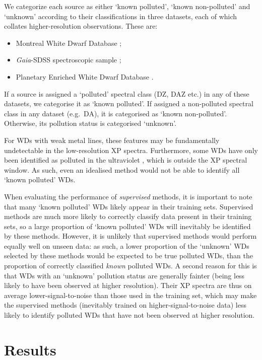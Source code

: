 \documentclass[fleqn,usenatbib]{rasti}
\begin{document}
We categorize each source as either `known polluted', `known non-polluted' and `unknown' according to their classifications in three datasets, each of which collates higher-resolution observations.
These are:
\begin{itemize}
\item Montreal White Dwarf Database \citep[MWDD;][]{dufour17};
\item \textit{Gaia}-SDSS spectroscopic sample \citep{gentilefusillo21};
\item Planetary Enriched White Dwarf Database \citep[PEWDD;][]{williams24}.
\end{itemize}
If a source is assigned a `polluted' spectral class (DZ, DAZ etc.) in any of these datasets, we categorise it as `known polluted'.
If assigned a non-polluted spectral class in any dataset (e.g.\ DA), it is categorised as `known non-polluted'.
Otherwise, its pollution status is categorised `unknown'.

For WDs with weak metal lines, these features may be fundamentally undetectable in the low-resolution XP spectra.
Furthermore, some WDs have only been identified as polluted in the ultraviolet \citep[$\lambda < 300\,\text{nm}$; e.g.][]{koester14, ouldrouis24}, which is outside the XP spectral window.
As such, even an idealised method would not be able to identify all `known polluted' WDs.

When evaluating the performance of \textit{supervised} methods, it is important to note that many `known polluted' WDs likely appear in their training sets.
Supervised methods are much more likely to correctly classify data present in their training sets, so a large proportion of `known polluted' WDs will inevitably be identified by these methods.
However, it is unlikely that supervised methods would perform equally well on unseen data: as such, a lower proportion of the `unknown' WDs selected by these methods would be expected to be true polluted WDs, than the proportion of correctly classified \textit{known} polluted WDs.
A second reason for this is that WDs with an `unknown' pollution status are generally fainter (being less likely to have been observed at higher resolution).
Their XP spectra are thus on average lower-signal-to-noise than those used in the training set, which may make the supervised methods (inevitably trained on higher-signal-to-noise data) less likely to identify polluted WDs that have not been observed at higher resolution.


\section{Results} \label{sec:results}
\end{document}
